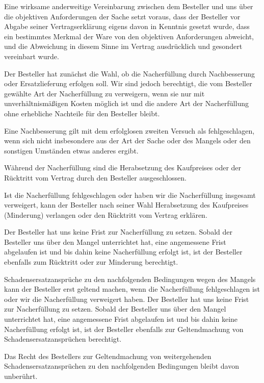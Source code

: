 \documentclass[fontsize=12pt,parskip=half]{scrartcl}
\begin{document}
\begin{contract}
Eine wirksame anderweitige Vereinbarung zwischen dem Besteller und uns über die objektiven Anforderungen der Sache setzt voraus, dass der Besteller vor Abgabe seiner Vertragserklärung eigens davon in Kenntnis gesetzt wurde, dass ein bestimmtes Merkmal der Ware von den objektiven Anforderungen abweicht, und die Abweichung in diesem Sinne im Vertrag ausdrücklich und gesondert vereinbart wurde.

\Clause[title={Nacherfüllung und Nachbesserung}]

Der Besteller hat zunächst die Wahl, ob die Nacherfüllung durch Nachbesserung oder Ersatzlieferung erfolgen soll. Wir sind jedoch berechtigt, die vom Besteller gewählte Art der Nacherfüllung zu verweigern, wenn sie nur mit unverhältnismäßigen Kosten möglich ist und die andere Art der Nacherfüllung ohne erhebliche Nachteile für den Besteller bleibt. 

Eine Nachbesserung gilt mit dem erfolglosen zweiten Versuch als fehlgeschlagen, wenn sich nicht insbesondere aus der Art der Sache oder des Mangels oder den sonstigen Umständen etwas anderes ergibt. 

Während der Nacherfüllung sind die Herabsetzung des Kaufpreises oder der Rücktritt vom Vertrag durch den Besteller ausgeschlossen. 

Ist die Nacherfüllung fehlgeschlagen oder haben wir die Nacherfüllung insgesamt verweigert, kann der Besteller nach seiner Wahl Herabsetzung des Kaufpreises (Minderung) verlangen oder den Rücktritt vom Vertrag erklären.

Der Besteller hat uns keine Frist zur Nacherfüllung zu setzen. Sobald der Besteller uns über den Mangel unterrichtet hat, eine angemessene Frist abgelaufen ist und bis dahin keine Nacherfüllung erfolgt ist, ist der Besteller ebenfalls zum Rücktritt oder zur Minderung berechtigt.

Schadensersatzansprüche zu den nachfolgenden Bedingungen wegen des Mangels kann der Besteller erst geltend machen, wenn die Nacherfüllung fehlgeschlagen ist oder wir die Nacherfüllung verweigert haben. Der Besteller hat uns keine Frist zur Nacherfüllung zu setzen. Sobald der Besteller uns über den Mangel unterrichtet hat, eine angemessene Frist abgelaufen ist und bis dahin keine Nacherfüllung erfolgt ist, ist der Besteller ebenfalls zur Geltendmachung von Schadensersatzansprüchen berechtigt. 

Das Recht des Bestellers zur Geltendmachung von weitergehenden Schadensersatzansprüchen zu den nachfolgenden Bedingungen bleibt davon unberührt.


\end{contract}
\end{document}
